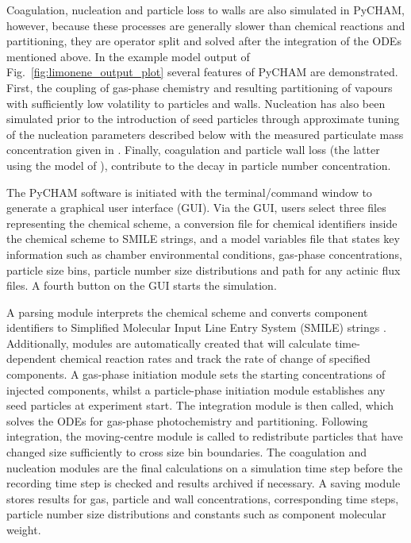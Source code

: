\documentclass[gmd, manuscript]{copernicus}
\begin{document}
Coagulation, nucleation and particle loss to walls are also simulated in PyCHAM, however, because these processes are generally slower than chemical reactions and partitioning, they are operator split and solved after the integration of the ODEs mentioned above.  In the example model output of Fig.~\ref{fig:limonene_output_plot} several features of PyCHAM are demonstrated.  First, the coupling of gas-phase chemistry and resulting partitioning of vapours with sufficiently low volatility to particles and walls.  Nucleation has also been simulated prior to the introduction of seed particles through approximate tuning of the nucleation parameters described below with the measured particulate mass concentration given in \citet{Fry2011}.  Finally, coagulation and particle wall loss (the latter using the model of \citet{McMurry1985}), contribute to the decay in particle number concentration.

The PyCHAM software is initiated with the terminal/command window to generate a graphical user interface (GUI).  Via the GUI, users select three files  representing the chemical scheme, a conversion file for chemical identifiers inside the chemical scheme to SMILE strings, and a model variables file that states key information such as chamber environmental conditions, gas-phase concentrations, particle size bins, particle number size distributions and path for any actinic flux files.  A fourth button on the GUI starts the simulation.

A parsing module interprets the chemical scheme and converts component identifiers to Simplified Molecular Input Line Entry System (SMILE) strings \citep{Weininger1988}.  Additionally, modules are automatically created that will calculate time-dependent chemical reaction rates and track the rate of change of specified components.  A gas-phase initiation module sets the starting concentrations of injected components, whilst a particle-phase initiation module establishes any seed particles at experiment start.  The integration module is then called, which solves the ODEs for gas-phase photochemistry and partitioning.  Following integration, the moving-centre module is called to redistribute particles that have changed size sufficiently to cross size bin boundaries.  The coagulation and nucleation modules are the final calculations on a simulation time step before the recording time step is checked and results archived if necessary.  A saving module stores results for gas, particle and wall concentrations, corresponding time steps, particle number size distributions and constants such as component molecular weight.
\end{document}
